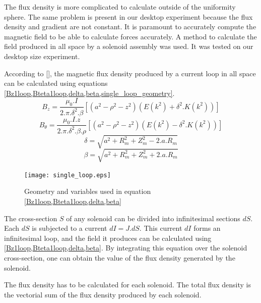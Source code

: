 \documentclass[letterpaper, 10 pt, conference]{ieeeconf}  %
\begin{document}
The flux density is more complicated to calculate outside of the uniformity sphere. The same problem is present in our desktop experiment because the flux density and gradient are not constant. It is paramount to accurately compute the magnetic field to be able to calculate forces accurately. A method to calculate the field produced in all space by a solenoid assembly was used. It was tested on our desktop size experiment.\par
According to [], the magnetic flux density produced by a current loop in all space can be calculated using equations \cref{Bz1loop,Bteta1loop,delta,beta,single_loop_geometry}.
\begin{equation}
B_z=\frac{\mu _0.I}{2.\pi.\delta ^{2}.\beta  }\left [ \left ( a^2-\rho ^2-z^2 \right )(E(k^2)+\delta ^2.K(k^2)) \right ] 
\label{Bz1loop}
\end{equation}
\begin{equation}
B_\theta=\frac{\mu _0.I.z}{2.\pi.\delta ^{2}.\beta.\rho   }\left [ \left ( a^2-\rho ^2-z^2 \right )(E(k^2)-\delta ^2.K(k^2)) \right ]
\label{Bteta1loop}
\end{equation}
\begin{equation}
\delta =\sqrt{a^2+R_m^2+Z_m^2-2.a.R_m}
\label{delta}
\end{equation}
\begin{equation}
\beta =\sqrt{a^2+R_m^2+Z_m^2+2.a.R_m}
\label{beta}
\end{equation}

\begin{figure}
  \texttt{[image: single\_loop.eps]}
  \caption{Geometry and variables used in equation \cref{Bz1loop,Bteta1loop,delta,beta}}
  \label{single_loop_geometry}
\end{figure}

The cross-section $S$ of any solenoid can be divided into infinitesimal sections $dS$. Each $dS$ is subjected to a current $dI=J.dS$. This current $dI$ forms an infinitesimal loop, and the field it produces can be calculated using \cref{Bz1loop,Bteta1loop,delta,beta}. By integrating this equation over the solenoid cross-section, one can obtain the value of the flux density generated by the solenoid.\par
The flux density has to be calculated for each solenoid. The total flux density is the vectorial sum of the flux density produced by each solenoid.
\end{document}

